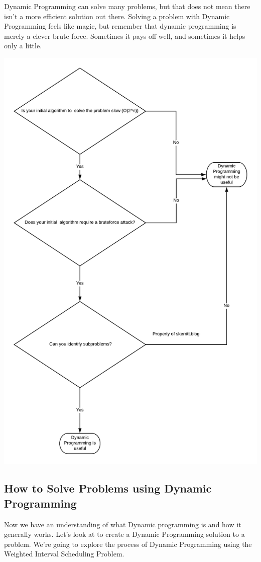 \documentclass{article}
\begin{document}
Dynamic Programming can solve many problems, but that does not mean there isn't a more efficient solution out there. Solving a problem with Dynamic Programming feels like magic, but remember that dynamic programming is merely a clever brute force. Sometimes it pays off well, and sometimes it helps only a little.

\includegraphics[width=\textwidth,height=\textheight,keepaspectratio]{m.png}
\newpage
\subsection{How to Solve Problems using Dynamic Programming}
Now we have an understanding of what Dynamic programming is and how it generally works. Let's look at to create a Dynamic Programming solution to a problem. We're going to explore the process of Dynamic Programming using the Weighted Interval Scheduling Problem.
\end{document}
